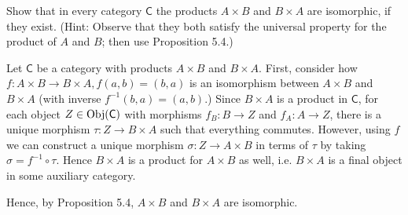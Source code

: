 \begin{problem}[5.8]
	Show that in every category $\mathsf{C}$ the products $A\times B$ and $B\times A$ are
	isomorphic, if they exist. (Hint: Observe that they both satisfy the universal
	property for the product of $A$ and $B$; then use Proposition 5.4.)
\end{problem}
\begin{solution}
	Let $\mathsf{C}$ be a category with products $A\times B$ and $B\times A$. First,
	consider how $f:A\times B\to B\times A, f(a,b) = (b,a)$ is an isomorphism
	between $A\times B$ and $B\times A$ (with inverse $f^{-1}(b,a) = (a,b)$.) Since
	$B\times A$ is a product in $\mathsf{C}$, for each object $Z\in\mathrm{Obj}(\mathsf{C})$ with morphisms
	$f_B:B\to Z$ and $f_A:A\to Z$, there is a unique morphism $\tau:Z\to B\times A$
	such that everything commutes. However, using $f$ we can construct a unique
	morphism $\sigma:Z\to A\times B$ in terms of $\tau$ by taking $\sigma =
	f^{-1}\circ\tau$. Hence $B\times A$ is a product for $A\times B$ as well, i.e.
	$B\times A$ is a final object in some auxiliary category.
	
	Hence, by Proposition 5.4, $A\times B$ and $B\times A$ are isomorphic.
\end{solution}


